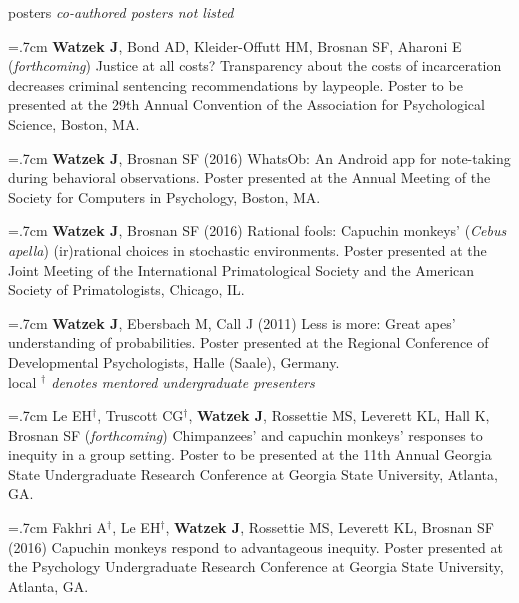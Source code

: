 \documentclass[]{friggeri-cv}
\begin{document}

{\subfont\large{} posters}
% 
\hspace{.35cm} {\small{} \emph{co-authored posters not listed}} %

\hangindent=.7cm \textbf{Watzek J}, Bond AD, Kleider-Offutt HM, Brosnan SF, Aharoni E (\emph{forthcoming}) Justice at all costs? Transparency about the costs of incarceration decreases criminal sentencing recommendations by laypeople. Poster to be presented at the 29th Annual Convention of the Association for Psychological Science, Boston, MA.

\hangindent=.7cm \textbf{Watzek J}, Brosnan SF (2016) WhatsOb: An Android app for note-taking during behavioral observations. Poster presented at the Annual Meeting of the Society for Computers in Psychology, Boston, MA.

\hangindent=.7cm \textbf{Watzek J}, Brosnan SF (2016) Rational fools: Capuchin monkeys' (\emph{Cebus apella}) (ir)rational choices in stochastic environments. Poster presented at the Joint Meeting of the International Primatological Society and the American Society of Primatologists, Chicago, IL.

\hangindent=.7cm \textbf{Watzek J}, Ebersbach M, Call J (2011) Less is more: Great apes' understanding of probabilities. Poster presented at the Regional Conference of Developmental Psychologists, Halle (Saale), Germany.\\[-.1cm]



{\subfont\large{} local}%
% 
\hspace{.35cm} {\small{} \emph{${}^\dagger$ denotes mentored undergraduate presenters}}

\hangindent=.7cm Le EH${}^\dagger$, Truscott CG${}^\dagger$, \textbf{Watzek J}, Rossettie MS, Leverett KL, Hall K, Brosnan SF (\emph{forthcoming}) Chimpanzees' and capuchin monkeys' responses to inequity in a group setting. Poster to be presented at the 11th Annual Georgia State Undergraduate Research Conference at Georgia State University, Atlanta, GA.

\hangindent=.7cm Fakhri A${}^\dagger$, Le EH${}^\dagger$, \textbf{Watzek J}, Rossettie MS, Leverett KL, Brosnan SF (2016) Capuchin monkeys respond to advantageous inequity. Poster presented at the Psychology Undergraduate Research Conference at Georgia State University, Atlanta, GA.\\[-.1cm]
\end{document}
